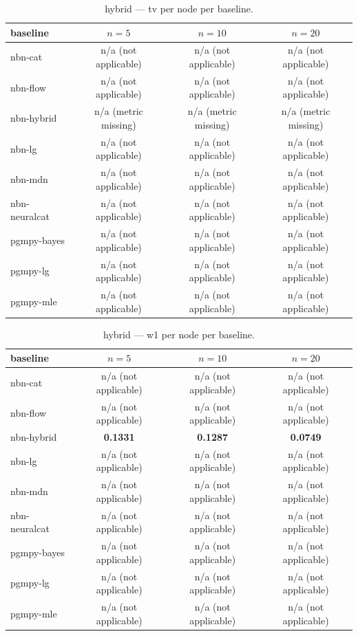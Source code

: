 \begin{table}[h]
\centering
\caption{hybrid — tv per node per baseline.}
\label{tab:hybrid_tv_per_node}
\begin{tabular}{lccc}
\toprule
baseline & $n=5$ & $n=10$ & $n=20$ \\
\midrule
nbn-cat & n/a (not applicable) & n/a (not applicable) & n/a (not applicable) \\
nbn-flow & n/a (not applicable) & n/a (not applicable) & n/a (not applicable) \\
nbn-hybrid & n/a (metric missing) & n/a (metric missing) & n/a (metric missing) \\
nbn-lg & n/a (not applicable) & n/a (not applicable) & n/a (not applicable) \\
nbn-mdn & n/a (not applicable) & n/a (not applicable) & n/a (not applicable) \\
nbn-neuralcat & n/a (not applicable) & n/a (not applicable) & n/a (not applicable) \\
pgmpy-bayes & n/a (not applicable) & n/a (not applicable) & n/a (not applicable) \\
pgmpy-lg & n/a (not applicable) & n/a (not applicable) & n/a (not applicable) \\
pgmpy-mle & n/a (not applicable) & n/a (not applicable) & n/a (not applicable) \\
\bottomrule
\end{tabular}
\end{table}

\begin{table}[h]
\centering
\caption{hybrid — w1 per node per baseline.}
\label{tab:hybrid_w1_per_node}
\begin{tabular}{lccc}
\toprule
baseline & $n=5$ & $n=10$ & $n=20$ \\
\midrule
nbn-cat & n/a (not applicable) & n/a (not applicable) & n/a (not applicable) \\
nbn-flow & n/a (not applicable) & n/a (not applicable) & n/a (not applicable) \\
nbn-hybrid & \textbf{0.1331} & \textbf{0.1287} & \textbf{0.0749} \\
nbn-lg & n/a (not applicable) & n/a (not applicable) & n/a (not applicable) \\
nbn-mdn & n/a (not applicable) & n/a (not applicable) & n/a (not applicable) \\
nbn-neuralcat & n/a (not applicable) & n/a (not applicable) & n/a (not applicable) \\
pgmpy-bayes & n/a (not applicable) & n/a (not applicable) & n/a (not applicable) \\
pgmpy-lg & n/a (not applicable) & n/a (not applicable) & n/a (not applicable) \\
pgmpy-mle & n/a (not applicable) & n/a (not applicable) & n/a (not applicable) \\
\bottomrule
\end{tabular}
\end{table}
